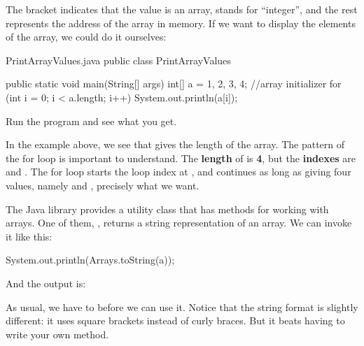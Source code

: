 The bracket indicates that the value is an array,  stands for ``integer'', and the rest represents the address of the array in memory.
If we want to display the elements of the array, we could do it ourselves:

\begin{trinket} [190] {PrintArrayValues.java}
public class PrintArrayValues {

    public static void main(String[] args) {
       int[] a = {1, 2, 3, 4}; //array initializer
        for (int i = 0; i < a.length; i++) {
           System.out.println(a[i]);
       }
    }
}
\end{trinket}

%
Run the program and see what you get.

In the example above, we see that  gives the length of the array.  The pattern of the for loop is important to understand.  The \textbf{length} of  is \textbf{4}, but the \textbf{indexes} are  and .  The for loop starts the loop index  at , and continues as long as  giving  four values, namely  and , precisely what we want.


The Java library provides a utility class  that has methods for working with arrays.
One of them, , returns a string representation of an array.
We can invoke it like this:

\begin{code}
System.out.println(Arrays.toString(a));
\end{code}

And the output is:

\begin{stdout}
[1, 2, 3, 4]
\end{stdout}

As usual, we have to  before we can use it.
Notice that the string format is slightly different: it uses square brackets instead of curly braces.
But it beats having to write your own  method.

